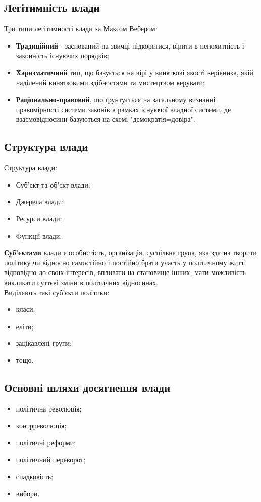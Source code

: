 \subsection{Легітимність влади}
Три типи легітимності влади за Максом Вебером:
\begin{itemize}
\item \textbf{Традиційний} - заснований на звичці підкорятися, вірити в непохитність і законність існуючих порядків;
\item \textbf{Харизматичний} тип, що базується на вірі у виняткові якості керівника, якій наділений винятковими здібностями та мистецтвом керувати;
\item \textbf{Раціонально-правовий}, що ґрунтується на загальному визнанні правомірності системи законів в рамках існуючої владної системи, де взаємовідносини базуються на схемі "демократія=довіра".
\end{itemize}
\subsection{Структура влади}
Структура влади:
\begin{itemize}
\item Суб’єкт та об’єкт влади;
\item Джерела влади;
\item Ресурси влади;
\item Функції влади.
\end{itemize}

\textbf{Суб’єктами} влади є особистість, організація, суспільна група, яка здатна творити політику чи відносно самостійно і постійно брати участь у політичному житті відповідно до своїх інтересів, впливати на становище інших, мати можливість викликати суттєві зміни в політичних відносинах.\\
Виділяють такі суб’єкти політики:
\begin{itemize}
\item класи;
\item еліти;
\item зацікавлені групи;
\item тощо.
\end{itemize}
\subsection{Основні шляхи досягнення влади}
\begin{itemize}
\item політична революція;
\item контрреволюція;
\item політичні реформи;
\item політичний переворот;
\item спадковість;
\item вибори.
\end{itemize}
